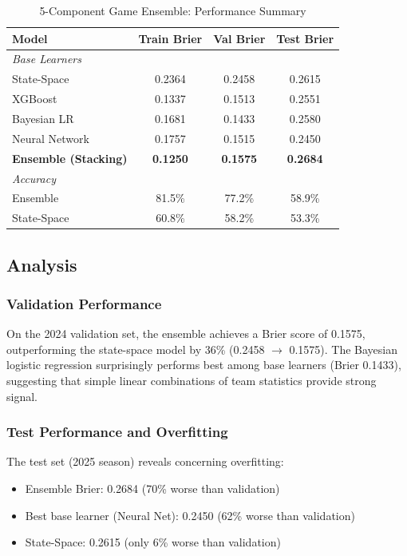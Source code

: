 \begin{table}[h]
\centering
\caption{5-Component Game Ensemble: Performance Summary}
\label{tab:game-ensemble-results}
\begin{tabular}{lccc}
\toprule
\textbf{Model} & \textbf{Train Brier} & \textbf{Val Brier} & \textbf{Test Brier} \\
\midrule
\textit{Base Learners} & & & \\
State-Space & 0.2364 & 0.2458 & 0.2615 \\
XGBoost & 0.1337 & 0.1513 & 0.2551 \\
Bayesian LR & 0.1681 & 0.1433 & 0.2580 \\
Neural Network & 0.1757 & 0.1515 & 0.2450 \\
\midrule
\textbf{Ensemble (Stacking)} & \textbf{0.1250} & \textbf{0.1575} & \textbf{0.2684} \\
\midrule
\textit{Accuracy} & & & \\
Ensemble & 81.5\% & 77.2\% & 58.9\% \\
State-Space & 60.8\% & 58.2\% & 53.3\% \\
\bottomrule
\end{tabular}
\end{table}

\subsection{Analysis}

\subsubsection{Validation Performance}

On the 2024 validation set, the ensemble achieves a Brier score of 0.1575, outperforming the state-space model by 36\% (0.2458 $\to$ 0.1575). The Bayesian logistic regression surprisingly performs best among base learners (Brier 0.1433), suggesting that simple linear combinations of team statistics provide strong signal.

\subsubsection{Test Performance and Overfitting}

The test set (2025 season) reveals concerning overfitting:

\begin{itemize}
    \item Ensemble Brier: 0.2684 (70\% worse than validation)
    \item Best base learner (Neural Net): 0.2450 (62\% worse than validation)
    \item State-Space: 0.2615 (only 6\% worse than validation)
\end{itemize}

